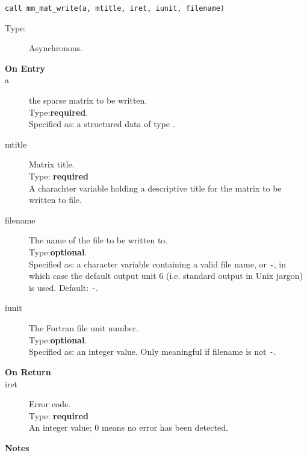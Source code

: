 \begin{lstlisting}
call mm_mat_write(a, mtitle, iret, iunit, filename)
\end{lstlisting}
\begin{description}
\item[Type:] Asynchronous.
\item[\bf  On Entry ]
\item[a] the sparse matrix to be written.\\
Type:{\bf required}.\\
Specified as: a structured data of type \spdata.
\item[mtitle] Matrix title.\\
Type: {\bf required} \\
A charachter variable holding a descriptive title for the matrix to be
 written to file.
\item[filename] The name of the file to be written to.\\
Type:{\bf optional}.\\
Specified as: a character variable containing a valid file name, or
\verb|-|, in which case the default output unit  6 (i.e. standard output
in Unix jargon) is used. Default: \verb|-|. 
\item[iunit] The Fortran file unit number.\\
Type:{\bf optional}.\\
Specified as: an integer value. Only meaningful if filename is not \verb|-|.
\end{description}

\begin{description}
\item[\bf On Return]
\item[iret] Error code.\\
Type: {\bf required} \\
An integer value; 0 means no error has been detected. 
\end{description}

{\par\noindent\large\bfseries Notes}

